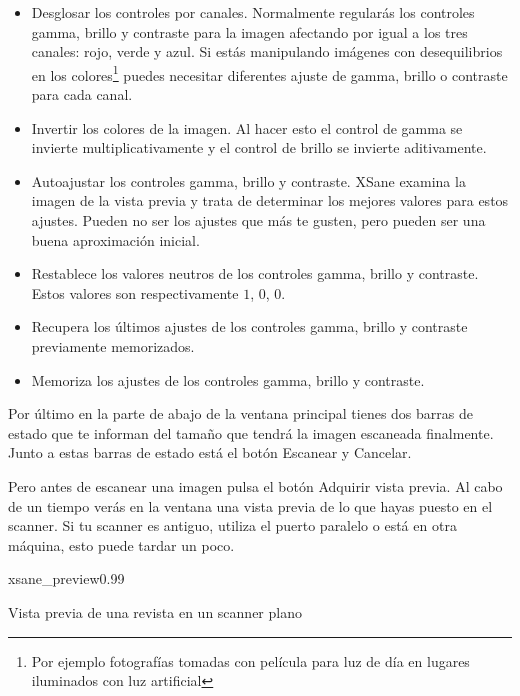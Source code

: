 \begin{itemize}

\item Desglosar  los controles por canales.  Normalmente regularás los
controles gamma, brillo y contraste para la imagen afectando por igual
a los tres canales: rojo, verde  y azul. Si estás manipulando imágenes
con  desequilibrios en  los  colores\footnote{Por ejemplo  fotografías
tomadas con  película para luz  de día  en lugares iluminados  con luz
artificial}  puedes necesitar  diferentes  ajuste de  gamma, brillo  o
contraste para cada canal.

\item Invertir los  colores de la imagen. Al hacer  esto el control de
gamma  se  invierte multiplicativamente  y  el  control de  brillo  se
invierte aditivamente.

\item Autoajustar los controles gamma, brillo y contraste. {\sf XSane}
examina la imagen de la vista previa y trata de determinar los mejores
valores  para estos  ajustes. Pueden  no ser  los ajustes  que más  te
gusten, pero pueden ser una buena aproximación inicial.

\item Restablece los valores neutros  de los controles gamma, brillo y
contraste. Estos valores son respectivamente $1$, $0$, $0$.

\item Recupera  los últimos ajustes  de los controles gamma,  brillo y
contraste previamente memorizados.

\item Memoriza los ajustes de los controles gamma, brillo y contraste.

\end{itemize}

Por último  en la parte  de abajo de  la ventana principal  tienes dos
barras  de estado  que te  informan del  tamaño que  tendrá la  imagen
escaneada finalmente.  Junto a  estas barras de  estado está  el botón
{\sf Escanear} y {\sf Cancelar}.

Pero antes de  escanear una imagen pulsa el botón  {\sf Adquirir vista
previa}. Al cabo de un tiempo verás  en la ventana una vista previa de
lo que hayas  puesto en el scanner. Si tu  scanner es antiguo, utiliza
el puerto paralelo o está en otra máquina, esto puede tardar un poco.

\begin{figura}{xsane_preview}{0.99}
\caption{Vista previa de una revista en un scanner plano}
\end{figura}


